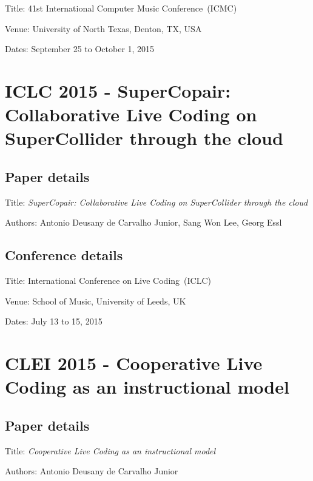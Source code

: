 Title: 41st International Computer Music Conference~(ICMC)

Venue: University of North Texas, Denton, TX, USA

Dates: September 25 to October 1, 2015



\section{ICLC 2015 - SuperCopair: Collaborative Live Coding on SuperCollider through the cloud}
\label{ape:papericlc2015}

\subsection*{Paper details}

Title: \textit{SuperCopair: Collaborative Live Coding on SuperCollider through the cloud}

Authors: Antonio Deusany de Carvalho Junior, Sang Won Lee, Georg Essl

\subsection*{Conference details}

Title: International Conference on Live Coding~(ICLC)

Venue: School of Music, University of Leeds, UK

Dates: July 13 to 15, 2015



\section{CLEI 2015 - Cooperative Live Coding as an instructional model}
\label{ape:paperclei2015}

\subsection*{Paper details}

Title: \textit{Cooperative Live Coding as an instructional model}

Authors: Antonio Deusany de Carvalho Junior

